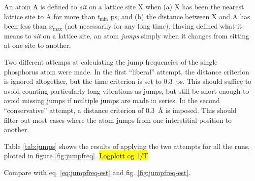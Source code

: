 \documentclass[11pt,bibliography=totoc,index=totoc]{scrbook}   %
\newcommand{\comment}[1]{\hl{#1}}
\begin{document}
An atom A is defined to \emph{sit} on a lattice site X when (a) X has been the nearest lattice site to A for more than $t_{\text{min}}$ ps, and (b) the distance between X and A has been less than $x_{\text{max}}$ (not necessarily for any long time). Having defined what it means to \emph{sit} on a lattice site, an atom \emph{jumps} simply when it changes from sitting at one site to another.

Two different attemps at calculating the jump frequencies of the single phosphorus atom were made.
In the first ``liberal'' attempt, the distance criterion is ignored altogether, but the time criterion is set to 0.3~ps.
This should suffice to avoid counting particularly long vibrations as jumps, but still be short enough to avoid missing jumps if multiple jumps are made in series. 
In the second ``conservative'' attempt, a distance criterion of 0.3~Å is imposed. This should filter out most cases where the atom jumps from one interstitial position to another. 

Table \ref{tab:jumps} shows the results of applying the two attempts for all the runs, plotted in figure \ref{fig:jumpfreq}. \comment{Logplott og 1/T}

Compare with eq. \eqref{eq:jumpfreq-est} and fig. \ref{fig:jumpfreq-est}.
\end{document}
